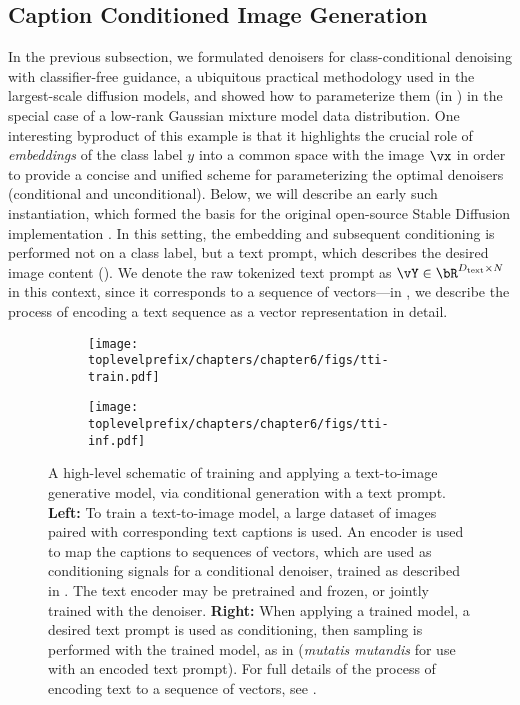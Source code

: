 \documentclass[../../book-main.tex]{subfiles}
\begin{document}
\subsection{Caption Conditioned Image Generation}\label{sub:text-cond}

In the previous subsection, we formulated denoisers for class-conditional
denoising with classifier-free guidance, a ubiquitous practical methodology used
in the largest-scale diffusion models, and showed how to parameterize them (in
) in the special case of a low-rank
Gaussian mixture model data distribution.
One interesting byproduct of this example is that it highlights the crucial role
of \textit{embeddings} of the class label $y$ into a common space with the image $\vx$ in
order to provide a concise and unified scheme for parameterizing the optimal
denoisers (conditional and unconditional).
Below, we will describe an early such instantiation, which
formed the basis for the original open-source Stable Diffusion implementation
\cite{rombach2022high}.
In this setting, the embedding and subsequent conditioning is performed not on
a class label, but a text prompt, which describes the desired image content
(). We denote the raw tokenized text prompt as $\vY \in
\bR^{D_{\mathrm{text}} \times N}$ in this context, since it corresponds to a sequence of
vectors---in , we describe the process of encoding a text
sequence as a vector representation in detail.

\begin{figure}[tbp]
  \centering
  \begin{subfigure}{0.47\textwidth}
    \texttt{[image: \\toplevelprefix/chapters/chapter6/figs/tti-train.pdf]}
    \caption{}
  \end{subfigure}
  \hfill
  \begin{subfigure}{0.47\textwidth}
    \texttt{[image: \\toplevelprefix/chapters/chapter6/figs/tti-inf.pdf]}
    \caption{}
  \end{subfigure}

  \caption{A high-level schematic of training and applying a text-to-image
  generative model, via conditional generation with a text prompt. \textbf{Left:}
  To train a text-to-image model, a large dataset of images paired with
  corresponding text captions is used. An encoder is used to map the captions to
  sequences of vectors, which are used as conditioning signals for a conditional
  denoiser, trained as described in . The text encoder may be
  pretrained and frozen, or jointly trained with the denoiser. \textbf{Right:}
  When applying a trained model, a desired text prompt is used as conditioning,
  then sampling is performed with the trained model, as in
   (\textit{mutatis mutandis} for
  use with an encoded text prompt). For full details of the process of encoding
  text to a sequence of vectors, see .}
  \label{fig:text-to-image}
\end{figure}
\end{document}
